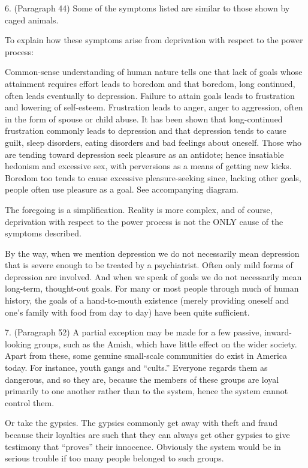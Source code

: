 6. (Paragraph 44) Some of the symptoms listed are similar to those shown by caged animals.

To explain how these symptoms arise from deprivation with respect to the power process:

Common-sense understanding of human nature tells one that lack of goals whose attainment requires effort leads to boredom and that boredom, long continued, often leads eventually to depression. Failure to attain goals leads to frustration and lowering of self-esteem. Frustration leads to anger, anger to aggression, often in the form of spouse or child abuse. It has been shown that long-continued frustration commonly leads to depression and that depression tends to cause guilt, sleep disorders, eating disorders and bad feelings about oneself. Those who are tending toward depression seek pleasure as an antidote; hence insatiable hedonism and excessive sex, with perversions as a means of getting new kicks. Boredom too tends to cause excessive pleasure-seeking since, lacking other goals, people often use pleasure as a goal. See accompanying diagram.

The foregoing is a simplification. Reality is more complex, and of course, deprivation with respect to the power process is not the ONLY cause of the symptoms described.

By the way, when we mention depression we do not necessarily mean depression that is severe enough to be treated by a psychiatrist. Often only mild forms of depression are involved. And when we speak of goals we do not necessarily mean long-term, thought-out goals. For many or most people through much of human history, the goals of a hand-to-mouth existence (merely providing oneself and one’s family with food from day to day) have been quite sufficient.

7. (Paragraph 52) A partial exception may be made for a few passive, inward-looking groups, such as the Amish, which have little effect on the wider society. Apart from these, some genuine small-scale communities do exist in America today. For instance, youth gangs and “cults.” Everyone regards them as dangerous, and so they are, because the members of these groups are loyal primarily to one another rather than to the system, hence the system cannot control them.

Or take the gypsies. The gypsies commonly get away with theft and fraud because their loyalties are such that they can always get other gypsies to give testimony that “proves” their innocence. Obviously the system would be in serious trouble if too many people belonged to such groups.

